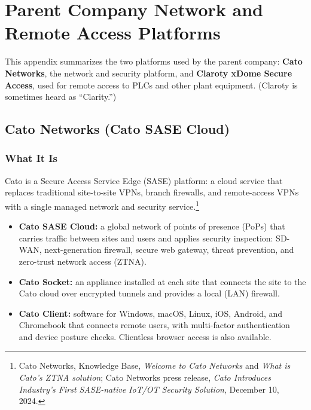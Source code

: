 \chapter{Parent Company Network and Remote Access Platforms}
\label{app:cato-claroty}

This appendix summarizes the two platforms used by the parent company: \textbf{Cato Networks}, the network and security platform, and \textbf{Claroty xDome Secure Access}, used for remote access to PLCs and other plant equipment. (Claroty is sometimes heard as ``Clarity.'')

\section{Cato Networks (Cato SASE Cloud)}
\subsection{What It Is}
Cato is a Secure Access Service Edge (SASE) platform: a cloud service that replaces traditional site-to-site VPNs, branch firewalls, and remote-access VPNs with a single managed network and security service.\footnote{Cato Networks, Knowledge Base, \emph{Welcome to Cato Networks} and \emph{What is Cato's ZTNA solution}; Cato Networks press release, \emph{Cato Introduces Industry's First SASE-native IoT/OT Security Solution}, December 10, 2024.}
\begin{itemize}[itemsep=1pt]
  \item \textbf{Cato SASE Cloud:} a global network of points of presence (PoPs) that carries traffic between sites and users and applies security inspection: SD-WAN, next-generation firewall, secure web gateway, threat prevention, and zero-trust network access (ZTNA).
  \item \textbf{Cato Socket:} an appliance installed at each site that connects the site to the Cato cloud over encrypted tunnels and provides a local (LAN) firewall.
  \item \textbf{Cato Client:} software for Windows, macOS, Linux, iOS, Android, and Chromebook that connects remote users, with multi-factor authentication and device posture checks. Clientless browser access is also available.
\end{itemize}

